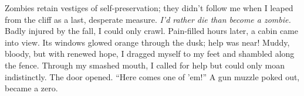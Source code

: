 
Zombies retain vestiges of self-preservation; they didn't follow me when
I leaped from the cliff as a last, desperate measure. \emph{I'd rather
die than become a zombie.} Badly injured by the fall, I could only
crawl. Pain-filled hours later, a cabin came into view. Its windows
glowed orange through the dusk; help was near! Muddy, bloody, but with
renewed hope, I dragged myself to my feet and shambled along the fence.
Through my smashed mouth, I called for help but could only moan
indistinctly. The door opened. ``Here comes one of 'em!'' A gun muzzle
poked out, became a zero.

